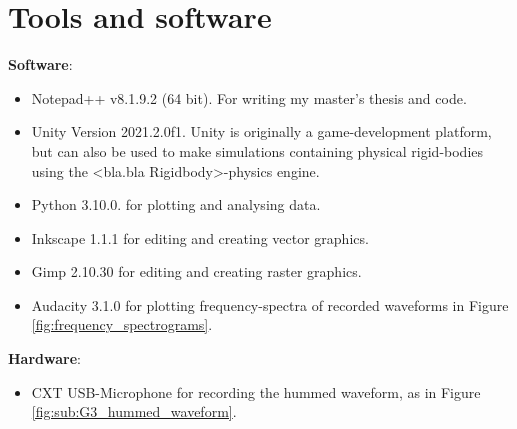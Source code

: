 \chapter{Tools and software}
	
	\textbf{Software}:
	\begin{itemize}
		\item Notepad++ v8.1.9.2 (64 bit). For writing my master's thesis and code.
		
		\item Unity Version 2021.2.0f1. Unity is originally a game-development platform, but can also be used to make  simulations containing physical rigid-bodies using the <bla.bla Rigidbody>-physics engine.
		
		\item Python 3.10.0. for plotting and analysing data.
		
		\item Inkscape 1.1.1 for editing and creating vector graphics.
		
		\item Gimp 2.10.30 for editing and creating raster graphics.
		
		\item Audacity 3.1.0 for plotting frequency-spectra of recorded waveforms in Figure \ref{fig:frequency_spectrograms}.
	\end{itemize}
	
	\textbf{Hardware}:
	\begin{itemize}
		\item CXT USB-Microphone for recording the hummed waveform, as in Figure \ref{fig:sub:G3_hummed_waveform}.
	\end{itemize}
	